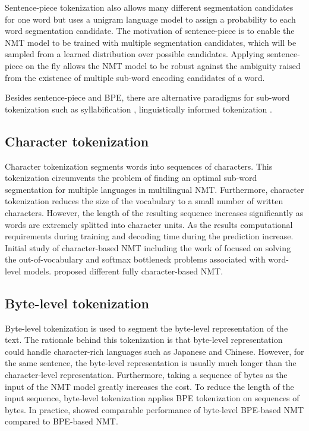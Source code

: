 Sentence-piece tokenization also allows many different segmentation candidates for one word but uses a unigram language model to assign a probability to each word segmentation candidate. The motivation of sentence-piece is to enable the NMT model to be trained with multiple segmentation candidates, which will be sampled from a learned distribution over possible candidates. Applying sentence-piece on the fly allows the NMT model to be robust against the ambiguity raised from the existence of multiple sub-word encoding candidates of a word. 

Besides sentence-piece and BPE, there are alternative paradigms for sub-word tokenization such as syllabification \citep{Assylbekov17syllable}, linguistically informed tokenization \citep{Ataman17linguistically, Huck17target, Machcek18morphological}.
\subsection{Character tokenization}
Character tokenization segments words into sequences of characters. This tokenization circumvents the problem of finding an optimal sub-word segmentation for multiple languages in multilingual NMT. Furthermore, character tokenization reduces the size of the vocabulary to a small number of written characters. However, the length of the resulting sequence increases significantly as words are extremely splitted into character units. As the results computational requirements during training and decoding time during the prediction increase. Initial study of character-based NMT including the work of \citet{Wang15character,Luong16achieving} focused on solving the out-of-vocabulary and softmax bottleneck problems associated with word-level models. \citet{Costa16character, Lee17fully, Chung16character, costa17byte} proposed different fully character-based NMT.
\subsection{Byte-level tokenization}
Byte-level tokenization is used to segment the byte-level representation of the text. The rationale behind this tokenization is that byte-level representation could handle character-rich languages such as Japanese and Chinese. However, for the same sentence, the byte-level representation is usually much longer than the character-level representation. Furthermore, taking a sequence of bytes as the input of the NMT model greatly increases the cost. To reduce the length of the input sequence, byte-level tokenization applies BPE tokenization on sequences of bytes. In practice, \citet{Wang19neural} showed comparable performance of byte-level BPE-based NMT compared to BPE-based NMT. 
